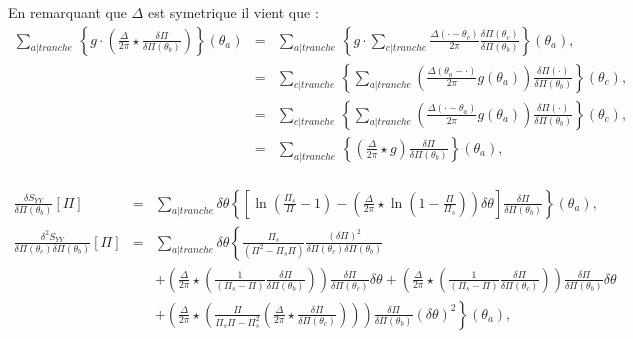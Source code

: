 		En remarquant que $\Delta$ est symetrique il vient que : 
	\begin{eqnarray}
		\sum_{a\vert tranche}   \,  \left \{ g  \cdot  	\left  ( \frac{\Delta}{2\pi} \star  \frac{\delta \Pi}{\delta \Pi(\theta_b)} \right ) \right \}( \theta_a) & = & \sum_{a\vert tranche}   \,  \left \{ g  \cdot  \sum_{c\vert tranche}    	
		 \frac{\Delta ( \cdot - \theta_c)}{2\pi}  \frac{\delta \Pi (\theta_c) }{\delta \Pi(\theta_b)}\right \}( \theta_a),\\
		 & = & \sum_{c\vert tranche}   \,  \left \{  \sum_{a\vert tranche}      	
		  \left ( \frac{\Delta ( \theta_a - \cdot )}{2\pi}  g ( \theta_a) \right ) \frac{\delta \Pi (\cdot) }{\delta \Pi(\theta_b)}\right \}( \theta_c),\\
		  & = & \sum_{c\vert tranche}  \,  \left \{  \sum_{a\vert tranche}      	
		  \left ( \frac{\Delta ( \cdot - \theta_a)}{2\pi}  g ( \theta_a) \right ) \frac{\delta \Pi (\cdot) }{\delta \Pi(\theta_b)}\right \}( \theta_c),\\
		  & = & \sum_{a\vert tranche}   \,  \left \{        	
		  \left ( \frac{\Delta}{2\pi}   \star g \right ) \frac{\delta \Pi  }{\delta \Pi(\theta_b)}\right \}( \theta_a),\\
	\end{eqnarray}	
	
	\begin{eqnarray}
			\frac{ \delta S_{YY} }{ \delta \Pi(\theta_b)} [\Pi ]  & = & \sum_{a\vert tranche}   \delta \theta \left \{ \left [ \ln \left ( \frac{ \Pi_s }{ \Pi} - 1 \right ) -  \left ( \frac{ \Delta}{2 \pi} \star \ln \left ( 1 - \frac{ \Pi}{ \Pi_s}\right )  \right)  \delta \theta\right ]\frac{\delta \Pi }{ \delta \Pi (\theta_b) } \right \} ( \theta_	a ),\\
			\frac{ \delta^2 S_{YY} }{ \delta \Pi(\theta_c) \delta \Pi(\theta_b)  } [\Pi ]  & = & \sum_{a \vert tranche}   \delta \theta \left \{  \frac{\Pi_s}{(\Pi^2  - \Pi_s\Pi)} \frac{(\delta \Pi)^2}{ \delta \Pi(\theta_c) \delta \Pi(\theta_b)  } \right . \\
		&  &  +  \left . \left (  \frac{\Delta}{2\pi} \star \left ( \frac{1 }{(\Pi_s -\Pi) }  \frac{\delta \Pi}{\delta \Pi(\theta_b)}  \right )   \right ) \frac{\delta \Pi}{\delta \Pi(\theta_c)} \delta \theta+  \left (  \frac{\Delta}{2\pi} \star \left ( \frac{1}{( \Pi_s -  \Pi) } \frac{\delta \Pi}{\delta \Pi(\theta_c)} \right) \right )\frac{\delta \Pi}{\delta \Pi(\theta_b)} \delta \theta  \right . \\
		& & + \left .  \left (  \frac{\Delta}{2\pi} \star \left ( \frac{\Pi }{\Pi_s\Pi - \Pi_s^2 }\left (  \frac{\Delta}{2\pi} \star\frac{\delta \Pi}{\delta \Pi(\theta_c)} \right )\right ) \right ) \frac{\delta \Pi}{\delta \Pi(\theta_b)} (\delta \theta)^2  \right \}(\theta_a),	
	\end{eqnarray}
	
